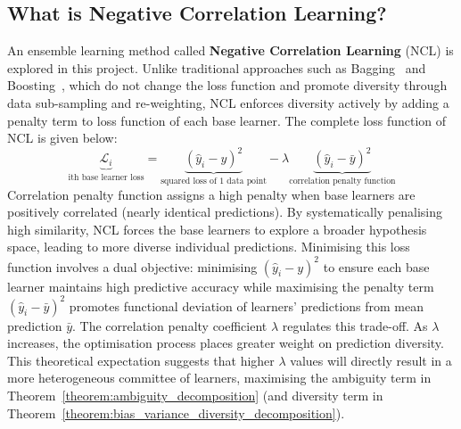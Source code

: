 \subsection{What is Negative Correlation Learning? }
\label{subsec:background_ncl}
An ensemble learning method called \textbf{Negative Correlation Learning} (NCL) is explored in this project. Unlike traditional approaches such as Bagging~\cite{breiman1996bagging} and Boosting~\cite{freund1997decision}, which do not change the loss function and promote diversity through data sub-sampling and re-weighting, NCL enforces diversity actively by adding a penalty term to loss function of each base learner. The complete loss function of NCL is given below: 
\begin{equation}
    \label{equation:ncl}
    \underbrace{\mathcal{L}_i}_{\text{ith base learner loss}} = \underbrace{(\hat{y}_i - y)^2}_{\text{squared loss of 1 data point}} - \lambda \underbrace{(\hat{y}_i - \bar{y})^2}_{\text{correlation penalty function}}
\end{equation}
Correlation penalty function assigns a high penalty when base learners are positively correlated (nearly identical predictions). By systematically penalising high similarity, NCL forces the base learners to explore a broader hypothesis space, leading to more diverse individual predictions. Minimising this loss function involves a dual objective: minimising $(\hat{y}_i - y)^2$ to ensure each base learner maintains high predictive accuracy while maximising the penalty term $(\hat{y}_i - \bar{y})^2$ promotes functional deviation of learners' predictions from mean prediction $\bar{y}$. The correlation penalty coefficient $\lambda$ regulates this trade-off. As $\lambda$ increases, the optimisation process places greater weight on prediction diversity. This theoretical expectation suggests that higher $\lambda$ values will directly result in a more heterogeneous committee of learners, maximising the ambiguity term in Theorem~\ref{theorem:ambiguity_decomposition} (and diversity term in Theorem~\ref{theorem:bias_variance_diversity_decomposition}). 

